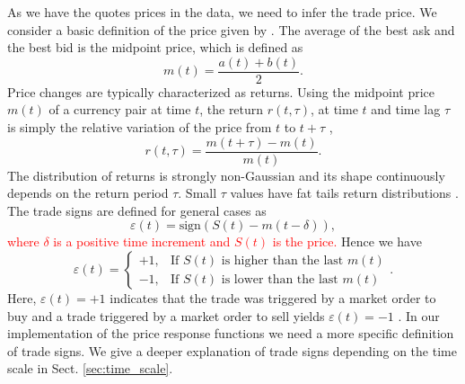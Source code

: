 As we have the quotes prices in the data, we need to infer the trade price. We
consider a basic definition of the price given by
\cite{forex_liquidity,patterns_forex,political_forex}. The average of the best
ask and the best bid is the midpoint price, which is defined as
\cite{teach_spread,subtle_nature,Bouchaud_2004,my_paper_response_financial,prop_order_book,stat_theory,large_prices_changes,em_stylized_facts}
\begin{equation}
    m \left(t\right) = \frac{a\left(t\right) + b\left(t\right)}{2}.
\end{equation}
Price changes are typically characterized as returns. Using the midpoint price
$m\left( t\right)$ of a currency pair at time $t$, the return
$r\left(t, \tau\right)$, at time $t$ and time lag $\tau$ is simply the relative
variation of the price from $t$ to $t + \tau$
\cite{subtle_nature,empirical_facts,asynchrony_effects_corr,tick_size_impact,causes_epps_effect,non_stationarity},
\begin{equation}\label{eq:midpoint_price_return}
    r\left(t,\tau\right) = \frac{m\left(t+\tau\right)-m\left(t\right)}
    {m\left(t\right)}.
\end{equation}
The distribution of returns is strongly non-Gaussian and its shape continuously
depends on the return period $\tau$. Small $\tau$ values have fat tails return
distributions \cite{subtle_nature}. The trade signs are defined for general
cases as
\begin{equation}\label{eq:trade_sign_general}
    \varepsilon\left(t\right)=\text{sign}\left(S\left(t\right)
    -m\left(t-\delta\right)\right),
\end{equation}
\textcolor{red}{where $\delta$ is a positive time increment and $S\left(t\right)$ is the price.}
Hence we have
\begin{equation}\label{eq:trade_sign_results}
    \varepsilon\left(t\right)=\left\{
    \begin{array}{cc}
    +1, & \text{If } S\left(t\right)
    \text{ is higher than the last } m\left( t \right)\\
    -1, & \text{If } S\left(t\right)
    \text{ is lower than the last } m\left( t \right)
    \end{array}\right. .
\end{equation}
Here, $\varepsilon(t) = +1$ indicates that the trade was triggered by a market
order to buy and a trade triggered by a market order to sell yields
$\varepsilon(t) = -1$
\cite{subtle_nature,Bouchaud_2004,spread_changes_affect,quant_stock_price_response,order_flow_persistent}.
In our implementation of the price response functions we need a more specific
definition of trade signs. We give a deeper explanation of trade signs
depending on the time scale in Sect. \ref{sec:time_scale}.

